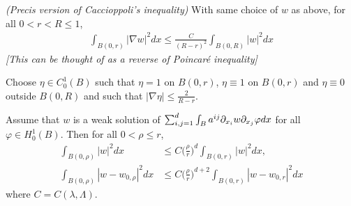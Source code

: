 \documentclass[12pt,a4paper]{article}
\newenvironment{proof}
{\begin{changemargin}{0.5cm}{0.5cm} 
	}%
	{\end{changemargin}
}
\newenvironment{p}
{\begin{proof} 
	}%
	{\end{proof}
}
\begin{document}
\corr \emph{(Precis version of Caccioppoli's inequality)} With same choice of $w$ as above, for all $0<r<R\leq 1$,
\begin{align*}
\int_{B(0,r)} |\nabla w|^2 dx \leq \frac{C}{(R-r)^2} \int_{B(0,R)} |w|^2 dx
\end{align*}
\emph{[This can be thought of as a reverse of Poincar\'e inequality]}
\begin{p}
\pf Choose $\eta \in C_0^1(B)$ such that $\eta =1$ on $B(0, r)$, $\eta \equiv 1$ on $B(0, r)$ and $\eta \equiv 0$ outside $B(0, R)$ and such that $|\nabla \eta| \leq \frac{2}{R-r}$.

\eop
\end{p}
\s

\prop Assume that $w$ is a weak solution of $\sum_{i,j=1}^d \int_B a^{ij} \partial_{x_i} w \partial_{x_j} \varphi dx$ for all $\varphi \in H_0^1(B)$. Then for all  $0< \rho \leq r$, 
\begin{align*}
\int_{B(0, \rho)} |w|^2 dx &\leq C\big( \frac{\rho}{r} \big)^d \int_{B(0, r)} |w|^2 dx,\\
\int_{B(0, \rho)} |w - w_{0, \rho}|^2 dx &\leq C \big(\frac{\rho}{r} \big)^{d+2} \int_{B(0,r)} |w- w_{0,r}|^2 dx
\end{align*}
where $C= C(\lambda, \Lambda)$.
\end{document}
